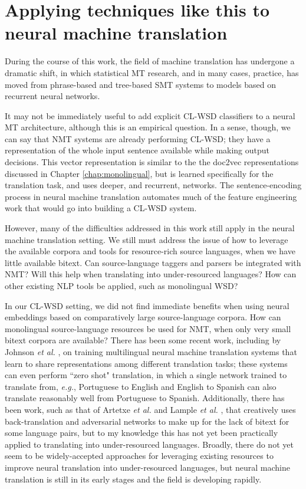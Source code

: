 \section{Applying techniques like this to neural machine translation}
During the course of this work, the field of machine translation has undergone
a dramatic shift, in which statistical MT research, and in many cases,
practice\cite{gnmt}, has moved from phrase-based and tree-based SMT systems to
models based on recurrent neural networks.

It may not be immediately useful to add explicit CL-WSD classifiers to a neural
MT architecture, although this is an empirical question. In a sense, though,
we can say that NMT systems are already performing CL-WSD; they have a
representation of the whole input sentence available while making output
decisions. This vector representation is similar to the the doc2vec
representations discussed in Chapter \ref{chap:monolingual}, but is learned
specifically for the translation task, and uses deeper, and recurrent,
networks. The sentence-encoding process in neural machine translation
automates much of the feature engineering work that would go into building a
CL-WSD system.

However, many of the difficulties addressed in this work still apply in the
neural machine translation setting. We still must address the issue of how to
leverage the available corpora and tools for resource-rich source languages,
when we have little available bitext. Can source-language taggers and parsers
be integrated with NMT? Will this help when translating into under-resourced
languages? How can other existing NLP tools be applied, such as monolingual
WSD?

In our CL-WSD setting, we did not find immediate benefits when using neural
embeddings based on comparatively large source-language corpora. How can
monolingual source-language resources be used for NMT, when only very small
bitext corpora are available?  There has been some recent work, including by
Johnson \emph{et al.} \cite{TACL1081}, on training multilingual neural machine
translation systems that learn to share representations among different
translation tasks; these systems can even perform ``zero shot" translation, in
which a single network trained to translate from, \emph{e.g.}, Portuguese to
English and English to Spanish can also translate reasonably well from
Portuguese to Spanish.
Additionally, there has been work, such as that of Artetxe \emph{et al.}
\cite{artetxe2018unsupervised} and Lample \emph{et al.}
\cite{lample2018unsupervised}, that creatively uses back-translation and
adversarial networks to make up for the lack of bitext for some language pairs,
but to my knowledge this has not yet been practically applied to translating
into under-resourced languages.  Broadly, there do not yet seem to be
widely-accepted approaches for leveraging existing resources to improve neural
translation into under-resourced languages, but neural machine translation is
still in its early stages and the field is developing rapidly.

